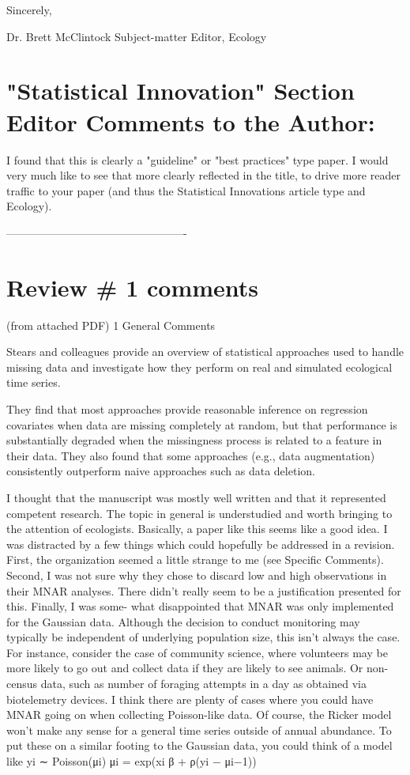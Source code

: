 \documentclass{article}
\begin{document}
Sincerely,

Dr. Brett McClintock
Subject-matter Editor, Ecology

\section{"Statistical Innovation" Section Editor Comments to the Author:}

I found that this is clearly a "guideline" or "best practices" type paper.  I would very much like to see that more clearly reflected in the title, to drive more reader traffic to your paper (and thus the Statistical Innovations article type and Ecology).

-------------------------------------------------
\section{Review # 1 comments}
(from attached PDF)
1 General Comments

Stears and colleagues provide an overview of statistical approaches used to handle missing data and investigate how they perform on real and simulated ecological time series.

They find that most approaches provide reasonable inference on regression covariates when data are missing completely at random, but that performance is substantially degraded when the missingness process is related to a feature in their data. They also found that some approaches (e.g., data augmentation) consistently outperform naive approaches such as data deletion.

I thought that the manuscript was mostly well written and that it represented competent research. The topic in general is understudied and worth bringing to the attention of ecologists. Basically, a paper like this seems like a good idea.
I was distracted by a few things which could hopefully be addressed in a revision.
First, the organization seemed a little strange to me (see Specific Comments). Second, I was not sure why they chose to discard low and high observations in their MNAR analyses. There didn’t really seem to be a justification presented for this. Finally, I was some-
what disappointed that MNAR was only implemented for the Gaussian data. Although the decision to conduct monitoring may typically be independent of underlying population size, this isn’t always the case. For instance, consider the case of community science, where volunteers may be more likely to go out and collect data if they are likely to see
animals. Or non-census data, such as number of foraging attempts in a day as obtained via biotelemetry devices. I think there are plenty of cases where you could have MNAR going on when collecting Poisson-like data. Of course, the Ricker model won’t make any sense for a general time series outside of annual abundance. To put these on a similar
footing to the Gaussian data, you could think of a model like
yi ∼ Poisson(μi)
μi = exp(xi β + ρ(yi − μi−1))
\end{document}
